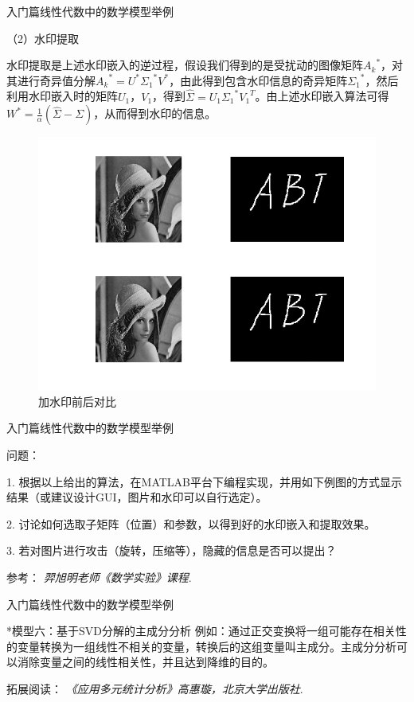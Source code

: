 \documentclass{beamer}
\begin{document}
\begin{frame}{入门篇}{线性代数中的数学模型举例}

{\color{blue} （2）水印提取}

水印提取是上述水印嵌入的逆过程，假设我们得到的是受扰动的图像矩阵${A_k}^*$，对其进行奇异值分解${A_k}^*=U^* {\Sigma_1}^* V^*$，由此得到包含水印信息的奇异矩阵${\Sigma_1}^*$，然后利用水印嵌入时的矩阵$U_1$，$V_1$，得到$\hat{\Sigma}=U_1 {\Sigma_1}^* {V_1}^T$。由上述水印嵌入算法可得$W^*=\frac{1}{\alpha}(\hat{\Sigma}-\Sigma)$，从而得到水印的信息。

\begin{figure}
  \centering
  \includegraphics[width=.5\textwidth]{figure//fig01.png} 
  \caption{加水印前后对比} 
  \label{fig01} 
\end{figure}

\end{frame}

\begin{frame}{入门篇}{线性代数中的数学模型举例}

{\color{blue} 问题：}

1. 根据以上给出的算法，在MATLAB平台下编程实现，并用如下例图的方式显示结果（或建议设计GUI，图片和水印可以自行选定）。

2. 讨论如何选取子矩阵（位置）和参数，以得到好的水印嵌入和提取效果。

3. 若对图片进行攻击（旋转，压缩等），隐藏的信息是否可以提出？

\footnotesize 参考：
\emph{羿旭明老师《数学实验》课程}.

\end{frame}

\begin{frame}{入门篇}{线性代数中的数学模型举例}
\begin{block}{*模型六：基于SVD分解的主成分分析}
例如：通过正交变换将一组可能存在相关性的变量转换为一组线性不相关的变量，转换后的这组变量叫主成分。主成分分析可以消除变量之间的线性相关性，并且达到降维的目的。

\footnotesize 拓展阅读：
\emph{《应用多元统计分析》高惠璇，北京大学出版社}.
\end{block}
\end{frame}
\end{document}
